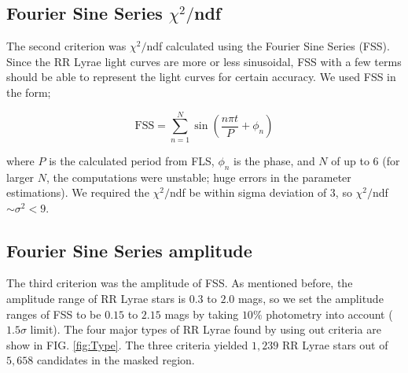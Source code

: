 \documentclass[aps,prb,twocolumn,superscriptaddress]{revtex4-1}
\begin{document}
\subsection{Fourier Sine Series $\chi^2/$ndf}
The second criterion was $\chi^2/$ndf calculated using the Fourier Sine Series (FSS). Since the RR Lyrae light curves are more or less sinusoidal, FSS with a few terms should be able to represent the light curves for certain accuracy. We used FSS in the form;

\begin{equation}
\label{FSS}
\text{FSS} = \sum_{n=1}^{N} \sin{\left(\frac{n \pi t}{P} + \phi_n \right)}
\end{equation}

\noindent where $P$ is the calculated period from FLS, $\phi_n$ is the phase, and $N$ of up to $6$ (for larger $N$, the computations were unstable; huge errors in the parameter estimations). We required the $\chi^2/$ndf be within sigma deviation of $3$, so $\chi^2/$ndf $\sim \sigma^2 < 9$. 

\subsection{Fourier Sine Series amplitude}
The third criterion was the amplitude of FSS. As mentioned before, the amplitude range of RR Lyrae stars is $0.3$ to $2.0$ mags, so we set the amplitude ranges of FSS to be $0.15$ to $2.15$ mags by taking $10\%$ photometry into account ($1.5\sigma$ limit). The four major types of RR Lyrae found by using out criteria are show in FIG. \ref{fig:Type}. The three criteria yielded $1,239$ RR Lyrae stars out of $5,658$ candidates in the masked region.
\end{document}
